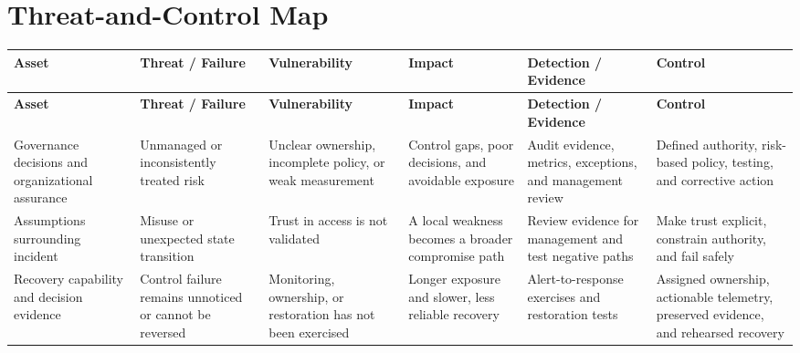 \documentclass[11pt]{article}
\begin{document}
\section*{Threat-and-Control Map}
\begingroup\scriptsize\setlength{\tabcolsep}{2pt}
\begin{longtable}{>{\RaggedRight\arraybackslash}p{}>{\RaggedRight\arraybackslash}p{}>{\RaggedRight\arraybackslash}p{}>{\RaggedRight\arraybackslash}p{}>{\RaggedRight\arraybackslash}p{}>{\RaggedRight\arraybackslash}p{}}
\toprule\rowcolor{Navy}\color{white}\textbf{Asset} & \color{white}\textbf{Threat / Failure} & \color{white}\textbf{Vulnerability} & \color{white}\textbf{Impact} & \color{white}\textbf{Detection / Evidence} & \color{white}\textbf{Control}\\\midrule
\endfirsthead
\toprule\rowcolor{Navy}\color{white}\textbf{Asset} & \color{white}\textbf{Threat / Failure} & \color{white}\textbf{Vulnerability} & \color{white}\textbf{Impact} & \color{white}\textbf{Detection / Evidence} & \color{white}\textbf{Control}\\\midrule
\endhead
Governance decisions and organizational assurance & Unmanaged or inconsistently treated risk & Unclear ownership, incomplete policy, or weak measurement & Control gaps, poor decisions, and avoidable exposure & Audit evidence, metrics, exceptions, and management review & Defined authority, risk-based policy, testing, and corrective action\\\midrule
Assumptions surrounding incident & Misuse or unexpected state transition & Trust in access is not validated & A local weakness becomes a broader compromise path & Review evidence for management and test negative paths & Make trust explicit, constrain authority, and fail safely\\\midrule
Recovery capability and decision evidence & Control failure remains unnoticed or cannot be reversed & Monitoring, ownership, or restoration has not been exercised & Longer exposure and slower, less reliable recovery & Alert-to-response exercises and restoration tests & Assigned ownership, actionable telemetry, preserved evidence, and rehearsed recovery\\\midrule
\bottomrule
\end{longtable}
\endgroup
\end{document}
